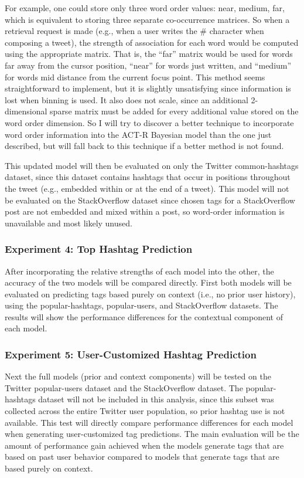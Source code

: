 \documentclass[man,floatsintext,donotrepeattitle]{apa6}
\begin{document}
For example, one could store only three word order values: near, medium, far, which is equivalent to storing three separate co-occurrence matrices.
So when a retrieval request is made (e.g., when a user writes the \# character when composing a tweet), the strength of association for each word would be computed using the appropriate matrix.
That is, the ``far'' matrix would be used for words far away from the cursor position, ``near'' for words just written, and ``medium'' for words mid distance from the current focus point.
This method seems straightforward to implement, but it is slightly unsatisfying since information is lost when binning is used.
It also does not scale, since an additional 2-dimensional sparse matrix must be added for every additional value stored on the word order dimension.
So I will try to discover a better technique to incorporate word order information into the ACT-R Bayesian model than the one just described, but will fall back to this technique if a better method is not found.

This updated model will then be evaluated on only the Twitter common-hashtags dataset, since this dataset contains hashtags that occur in positions throughout the tweet (e.g., embedded within or at the end of a tweet).
This model will not be evaluated on the StackOverflow dataset since chosen tags for a StackOverflow post are not embedded and mixed within a post, so word-order information is unavailable and most likely unused.

\subsubsection{Experiment 4: Top Hashtag Prediction}

After incorporating the relative strengths of each model into the other, the accuracy of the two models will be compared directly.
First both models will be evaluated on predicting tags based purely on context (i.e., no prior user history), using the popular-hashtags, popular-users, and StackOverflow datasets.
The results will show the performance differences for the contextual component of each model.

\subsubsection{Experiment 5: User-Customized Hashtag Prediction}

Next the full models (prior and context components) will be tested on the Twitter popular-users dataset and the StackOverflow dataset.
The popular-hashtags dataset will not be included in this analysis, since this subset was collected across the entire Twitter user population, so prior hashtag use is not available.
This test will directly compare performance differences for each model when generating user-customized tag predictions.
The main evaluation will be the amount of performance gain achieved when the models generate tags that are based on past user behavior compared to models that generate tags that are based purely on context.
\end{document}
